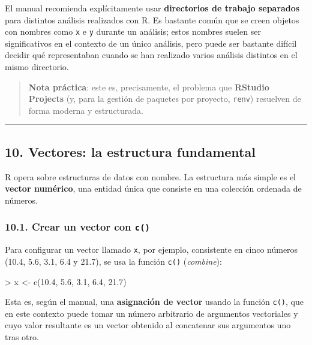 \documentclass[
  jou,
  floatsintext,
  longtable,
  a4paper,
  nolmodern,
  notxfonts,
  notimes,
  12pt,
  colorlinks=true,linkcolor=blue,citecolor=blue,urlcolor=blue]{apa7}
\newenvironment{Shaded}{\begin{snugshade}}{\end{snugshade}}
\newcommand{\FloatTok}[1]{\textcolor[rgb]{0.68,0.00,0.00}{#1}}
\newcommand{\FunctionTok}[1]{\textcolor[rgb]{0.28,0.35,0.67}{#1}}
\newcommand{\NormalTok}[1]{\textcolor[rgb]{0.00,0.23,0.31}{#1}}
\newcommand{\OtherTok}[1]{\textcolor[rgb]{0.00,0.23,0.31}{#1}}
\newcommand{\SpecialCharTok}[1]{\textcolor[rgb]{0.37,0.37,0.37}{#1}}
\begin{document}
El manual recomienda explícitamente usar \textbf{directorios de trabajo
separados} para distintos análisis realizados con R. Es bastante común
que se creen objetos con nombres como \texttt{x} e \texttt{y} durante un
análisis; estos nombres suelen ser significativos en el contexto de un
único análisis, pero puede ser bastante difícil decidir qué
representaban cuando se han realizado varios análisis distintos en el
mismo directorio.

\begin{quote}
\textbf{Nota práctica}: este es, precisamente, el problema que
\textbf{RStudio Projects} (y, para la gestión de paquetes por proyecto,
\texttt{renv}) resuelven de forma moderna y estructurada.
\end{quote}

\begin{center}\rule{0.5\linewidth}{0.5pt}\end{center}

\subsection{10. Vectores: la estructura
fundamental}\label{vectores-la-estructura-fundamental}

R opera sobre estructuras de datos con nombre. La estructura más simple
es el \textbf{vector numérico}, una entidad única que consiste en una
colección ordenada de números.

\subsubsection{\texorpdfstring{10.1. Crear un vector con
\texttt{c()}}{10.1. Crear un vector con c()}}\label{crear-un-vector-con-c}

Para configurar un vector llamado \texttt{x}, por ejemplo, consistente
en cinco números (10.4, 5.6, 3.1, 6.4 y 21.7), se usa la función
\texttt{c()} (\emph{combine}):

\begin{Shaded}
\begin{Highlighting}[]
\SpecialCharTok{\textgreater{}}\NormalTok{ x }\OtherTok{\textless{}{-}} \FunctionTok{c}\NormalTok{(}\FloatTok{10.4}\NormalTok{, }\FloatTok{5.6}\NormalTok{, }\FloatTok{3.1}\NormalTok{, }\FloatTok{6.4}\NormalTok{, }\FloatTok{21.7}\NormalTok{)}
\end{Highlighting}
\end{Shaded}

Esta es, según el manual, una \textbf{asignación de vector} usando la
función \texttt{c()}, que en este contexto puede tomar un número
arbitrario de argumentos vectoriales y cuyo valor resultante es un
vector obtenido al concatenar sus argumentos uno tras otro.
\end{document}
